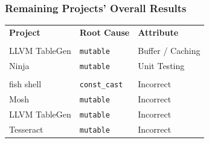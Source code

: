 \documentclass[aspectratio=43]{beamer}
\begin{document}
  \begin{frame}
    \frametitle{Remaining Projects' Overall Results}
    \large
    \begin{tabular}{b{3.4cm} b{2.6cm} b{3.2cm}}
      \textbf{Project} & \textbf{Root Cause}
      & \textbf{Attribute} \\
      & & \\
      LLVM TableGen & \texttt{mutable} & Buffer / Caching \\
      Ninja & \texttt{mutable} & Unit Testing \\
      & & \\
      fish shell & \texttt{const\_cast} & Incorrect \\
      Mosh & \texttt{mutable} & Incorrect \\
      LLVM TableGen & \texttt{mutable} & Incorrect \\
      Tesseract & \texttt{mutable} & Incorrect \\
    \end{tabular}
  \end{frame}
\end{document}
